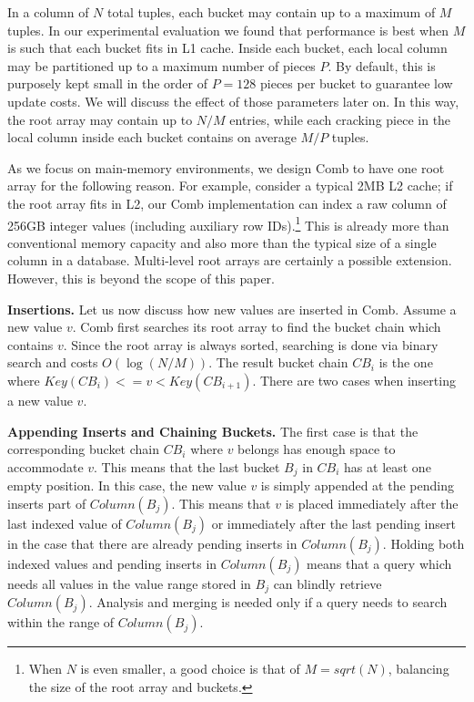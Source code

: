In a column of $N$ total tuples, each bucket may contain up to a maximum of $M$ tuples. 
In our experimental evaluation we found that performance is best when $M$ is such that each bucket fits in L1 cache.
Inside each bucket, each local column may be partitioned up to a maximum number of pieces $P$. 
By default, this is purposely kept small in the order of $P=128$ pieces per bucket to guarantee low update costs.
We will discuss the effect of those parameters later on.
In this way, the root array may contain up to $N/M$ entries, 
while each cracking piece in the local column inside each bucket contains on average  $M/P$ tuples. 

As we focus on main-memory environments, we design
Comb to have one root array for the following reason.
For example, consider a typical 2MB L2 cache; if the root array fits in L2,
our Comb implementation can index  
a raw column of 256GB integer values (including auxiliary row IDs).\footnote{
\small
When $N$ is even smaller,  a good choice is that of $M = sqrt(N)$,
balancing the size of the root array and buckets.
}
This is already more than conventional memory capacity and 
also more than the typical size of a single column in a database.
Multi-level root arrays are certainly a possible extension.
However, this is beyond the scope of this paper.

\textbf{Insertions.}
Let us now discuss how new values are inserted in Comb.
Assume a new value $v$. 
Comb first searches its root array to find the bucket chain which contains $v$.
Since the root array is always sorted, searching is done via binary search and costs $O(\log(N/M))$.
The result bucket chain $CB_i$ is the one where $Key(CB_i)<=v<Key(CB_{i+1})$.
There are two cases when inserting a new value $v$. 

\textbf{Appending Inserts and Chaining Buckets.}
The first case is that the corresponding bucket chain $CB_i$ where $v$ belongs has enough space to accommodate $v$.
This means that the last bucket $B_j$ in $CB_i$ has at least one empty position.
In this case, the new value $v$ is simply appended at the pending inserts part of $Column(B_j)$.
This means that $v$ is placed immediately after the last indexed value of $Column(B_j)$ or immediately after the
last pending insert in the case that there are already pending inserts in $Column(B_j)$.
Holding both indexed values and pending inserts in $Column(B_j)$ means that a query which needs all values
in the value range stored in $B_j$ can blindly retrieve $Column(B_j)$. Analysis and merging is needed
only if a query needs to search within the range of $Column(B_j)$. 

